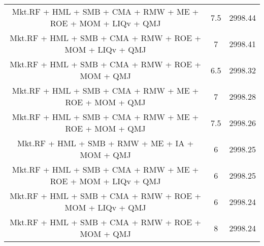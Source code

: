\begin{tabular}{ccc}
  Mkt.RF + HML + SMB + CMA + RMW + ME + ROE + MOM + LIQv + QMJ & 7.5 & 2998.44 \\ 
  Mkt.RF + HML + SMB + CMA + RMW + ROE + MOM + LIQv + QMJ & 7 & 2998.41 \\ 
  Mkt.RF + HML + SMB + CMA + RMW + ROE + MOM + QMJ & 6.5 & 2998.32 \\ 
  Mkt.RF + HML + SMB + CMA + RMW + ME + ROE + MOM + QMJ & 7 & 2998.28 \\ 
  Mkt.RF + HML + SMB + CMA + RMW + ME + ROE + MOM + QMJ & 7.5 & 2998.26 \\ 
  Mkt.RF + HML + SMB + RMW + ME + IA + MOM + QMJ & 6 & 2998.25 \\ 
  Mkt.RF + HML + SMB + CMA + RMW + ME + ROE + MOM + LIQv + QMJ & 6 & 2998.25 \\ 
  Mkt.RF + HML + SMB + CMA + RMW + ROE + MOM + LIQv + QMJ & 6 & 2998.24 \\ 
  Mkt.RF + HML + SMB + CMA + RMW + ROE + MOM + QMJ & 8 & 2998.24 \\ 
   \hline
\end{tabular}
